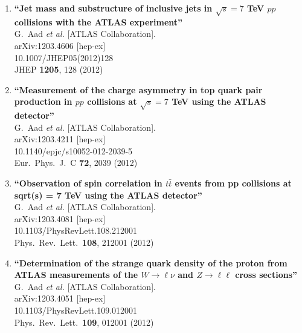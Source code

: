 \documentclass{article}
\begin{document}
\begin{enumerate}
\item%
{\bf ``Jet mass and substructure of inclusive jets in $\sqrt{s}=7$ TeV $pp$ collisions with the ATLAS experiment''}
  \\{}G.~Aad {\it et al.}  [ATLAS Collaboration].
  \\{}arXiv:1203.4606 [hep-ex]
    \\{}10.1007/JHEP05(2012)128
\\{}JHEP {\bf 1205}, 128 (2012) %


\item%
{\bf ``Measurement of the charge asymmetry in top quark pair production in $pp$ collisions at $\sqrt{s}=7$ TeV using the ATLAS detector''}
  \\{}G.~Aad {\it et al.}  [ATLAS Collaboration].
  \\{}arXiv:1203.4211 [hep-ex]
    \\{}10.1140/epjc/s10052-012-2039-5
\\{}Eur.\ Phys.\ J.\ C {\bf 72}, 2039 (2012) %


\item%
{\bf ``Observation of spin correlation in $t \bar{t}$ events from pp collisions at sqrt(s) = 7 TeV using the ATLAS detector''}
  \\{}G.~Aad {\it et al.}  [ATLAS Collaboration].
  \\{}arXiv:1203.4081 [hep-ex]
    \\{}10.1103/PhysRevLett.108.212001
\\{}Phys.\ Rev.\ Lett.\  {\bf 108}, 212001 (2012) %


\item%
{\bf ``Determination of the strange quark density of the proton from ATLAS measurements of the $W \to \ell \nu$ and $Z \to \ell\ell$ cross sections''}
  \\{}G.~Aad {\it et al.}  [ATLAS Collaboration].
  \\{}arXiv:1203.4051 [hep-ex]
    \\{}10.1103/PhysRevLett.109.012001
\\{}Phys.\ Rev.\ Lett.\  {\bf 109}, 012001 (2012) %



\end{enumerate}
\end{document}
